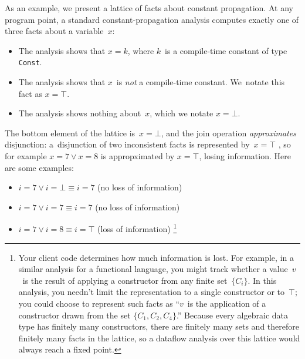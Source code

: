 \documentclass[blockstyle,preprint,natbib,nocopyrightspace]{sigplanconf}
\def\authornote#1{\unskip\relax}
\newcommand{\simon}[1]{\authornote{SLPJ: #1}}
\begin{document}
As an example, 
we present a lattice of facts about constant propagation.
At any program point, a standard constant-propagation analysis
computes exactly one of three
facts about a variable~$x$:
\begin{itemize}
\item
The analysis shows that
$x = k$, where $k$~is a compile-time constant of type \texttt{Const}.
\item
The analysis shows that $x$~is \emph{not} a compile-time constant.
We~notate this fact as $x = \top$.
\item
The analysis shows nothing about~$x$, which we notate $x=\bot$.
\end{itemize}
The bottom element of the lattice is~$x=\bot$, and
the join operation \emph{approximates} disjunction:\simon{No emphasis needed.}
a~disjunction 
\simon{I'd still like to give an intuition here about
\emph{why} disjunction is the key operation, and/or where is is used.
NR: With ``the next 700'' gone, I'm not sure where\ldots
}%
\simon{This would be a better place for the footnote. NR: Which footnote?}
of two inconsistent facts is represented by~$x=\top$%
\ifcutting,
so for example 
$x = 7 \lor x = 8$ is appropximated by $x = \top$, 
losing information.%
\else
Here are some examples:
\begin{itemize}
\item
$i = 7 \lor i=\bot \equiv i=7$ (no loss of information)
\item
$i = 7 \lor i= 7 \equiv  i=7$ (no loss of information)
\item
$i = 7 \lor i = 8 \equiv i = \top$ (loss of information)%
\fi
\footnote
{Your client code determines how much information is lost.
For example, in a similar analysis for a functional language,
you might track whether a value\ifcutting\else~$v$\fi\ is 
the result of applying a constructor from any finite set~$\{C_i\}$.
\ifcutting
\else
In this analysis, you needn't limit the representation to a
single constructor or to~$\top$;
you could choose to represent such facts as ``$v$~is
the application of a constructor drawn from the set $\{C_1, C_2,
C_4\}$.''
Because every algebraic data type has finitely many constructors,
there are finitely many sets and therefore finitely many facts in the
lattice, so a dataflow analysis over this lattice would always reach a
fixed point.
\fi
}
\ifcutting\else
\end{itemize}
\fi
\end{document}
